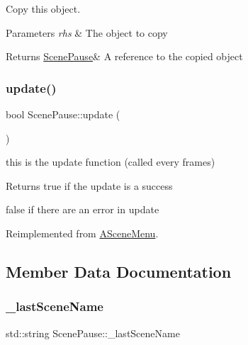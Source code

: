 Copy this object. 


\begin{DoxyParams}{Parameters}
{\em rhs} & The object to copy \\
\hline
\end{DoxyParams}
\begin{DoxyReturn}{Returns}
\hyperlink{class_scene_pause}{Scene\+Pause}\& A reference to the copied object 
\end{DoxyReturn}
\mbox{\label{class_scene_pause_a376de6952be83718fb19d268d9327ef6}} 
\subsubsection{\texorpdfstring{update()}{update()}}
{\footnotesize\ttfamily bool Scene\+Pause\+::update (\begin{DoxyParamCaption}{ }\end{DoxyParamCaption})\hspace{0.3cm}{\ttfamily [virtual]}}



this is the update function (called every frames) 

\begin{DoxyReturn}{Returns}
true if the update is a success 

false if there are an error in update 
\end{DoxyReturn}


Reimplemented from \hyperlink{class_a_scene_menu_a1deeb5fd9be97376998cd2af36f29744}{A\+Scene\+Menu}.



\subsection{Member Data Documentation}
\mbox{\label{class_scene_pause_a039f8c0c94692dc50f8ef6f6f4284b9b}} 
\subsubsection{\texorpdfstring{\+\_\+last\+Scene\+Name}{\_lastSceneName}}
{\footnotesize\ttfamily std\+::string Scene\+Pause\+::\+\_\+last\+Scene\+Name\hspace{0.3cm}{\ttfamily [protected]}}

